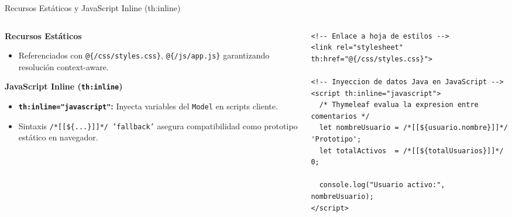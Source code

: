 \documentclass[aspectratio=169]{beamer}
\begin{document}
\begin{frame}[fragile]{Recursos Est\'aticos y JavaScript Inline (th:inline)}
\begin{columns}[c]
\begin{column}{0.48\textwidth}
  \textbf{Recursos Est\'aticos}
  \begin{itemize}
    \item Referenciados con \texttt{@\{/css/styles.css\}}, \texttt{@\{/js/app.js\}} garantizando resoluci\'on context-aware.
  \end{itemize}
  \vspace{4pt}
  \textbf{JavaScript Inline (\texttt{th:inline})}
  \begin{itemize}
    \item \textbf{\texttt{th:inline="javascript"}:} Inyecta variables del \texttt{Model} en scripts cliente.
    \item Sintaxis \texttt{/*[[\$\{...\}]]*/ 'fallback'} asegura compatibilidad como prototipo est\'atico en navegador.
  \end{itemize}
\end{column}
\begin{column}{0.50\textwidth}
\begin{lstlisting}[style=ThymeleafStyle]
<!-- Enlace a hoja de estilos -->
<link rel="stylesheet" th:href="@{/css/styles.css}">

<!-- Inyeccion de datos Java en JavaScript -->
<script th:inline="javascript">
  /* Thymeleaf evalua la expresion entre comentarios */
  let nombreUsuario = /*[[${usuario.nombre}]]*/ 'Prototipo';
  let totalActivos  = /*[[${totalUsuarios}]]*/ 0;
  
  console.log("Usuario activo:", nombreUsuario);
</script>
\end{lstlisting}
\end{column}
\end{columns}
\end{frame}

\end{document}

